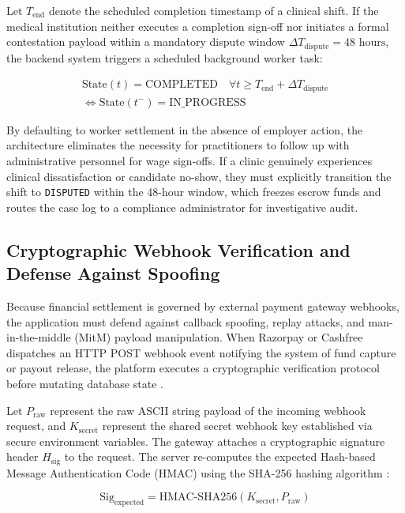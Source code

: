 \documentclass[conference]{IEEEtran}
\begin{document}
Let $T_{\text{end}}$ denote the scheduled completion timestamp of a clinical shift. If the medical institution neither executes a completion sign-off nor initiates a formal contestation payload within a mandatory dispute window $\Delta T_{\text{dispute}} = 48\text{ hours}$, the backend system triggers a scheduled background worker task:

\begin{equation}
\begin{split}
\text{State}(t) = \text{COMPLETED} \quad \forall t \ge T_{\text{end}} + \Delta T_{\text{dispute}} \\
\iff \text{State}(t^-) = \text{IN\_PROGRESS}
\end{split}
\end{equation}

By defaulting to worker settlement in the absence of employer action, the architecture eliminates the necessity for practitioners to follow up with administrative personnel for wage sign-offs. If a clinic genuinely experiences clinical dissatisfaction or candidate no-show, they must explicitly transition the shift to \texttt{DISPUTED} within the 48-hour window, which freezes escrow funds and routes the case log to a compliance administrator for investigative audit.

\subsection{Cryptographic Webhook Verification and Defense Against Spoofing}
Because financial settlement is governed by external payment gateway webhooks, the application must defend against callback spoofing, replay attacks, and man-in-the-middle (MitM) payload manipulation. When Razorpay or Cashfree dispatches an HTTP POST webhook event notifying the system of fund capture or payout release, the platform executes a cryptographic verification protocol before mutating database state \cite{razorpay2023webhooks}.

Let $P_{\text{raw}}$ represent the raw ASCII string payload of the incoming webhook request, and $K_{\text{secret}}$ represent the shared secret webhook key established via secure environment variables. The gateway attaches a cryptographic signature header $H_{\text{sig}}$ to the request. The server re-computes the expected Hash-based Message Authentication Code (HMAC) using the SHA-256 hashing algorithm \cite{krawczyk1997hmac}:

\begin{equation}
\text{Sig}_{\text{expected}} = \text{HMAC-SHA256}(K_{\text{secret}}, P_{\text{raw}})
\end{equation}
\end{document}
